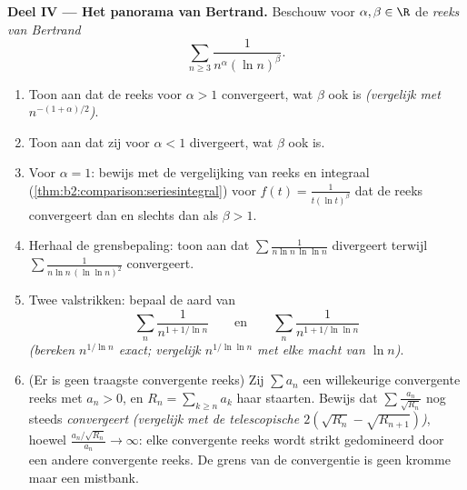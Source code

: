 \begin{problem}[{Weekendopgave --- $\zeta(2) = \pi^2/6$ en het
panorama van Bertrand}]
\medskip
\noindent\textbf{Deel IV --- Het panorama van Bertrand.} Beschouw
voor $\alpha, \beta \in \R$ de \emph{reeks van Bertrand}
\[
\sum_{n \geq 3} \frac{1}{n^{\alpha}(\ln n)^{\beta}} .
\]
\begin{enumerate}[resume]
  \item Toon aan dat de reeks voor $\alpha > 1$ convergeert, wat
        $\beta$ ook is \emph{(vergelijk met
        $n^{-(1+\alpha)/2}$)}.
  \item Toon aan dat zij voor $\alpha < 1$ divergeert, wat $\beta$
        ook is.
  \item Voor $\alpha = 1$: bewijs met de vergelijking van reeks en
        integraal (\cref{thm:b2:comparison:seriesintegral}) voor
        $f(t) = \frac{1}{t(\ln t)^\beta}$ dat de reeks
        convergeert dan en slechts dan als $\beta > 1$.
  \item Herhaal de grensbepaling: toon aan dat
        $\sum\frac{1}{n\ln n\,\ln\ln n}$ divergeert terwijl
        $\sum\frac{1}{n\ln n\,(\ln\ln n)^2}$ convergeert.
  \item Twee valstrikken: bepaal de aard van
        \[
        \sum_n \frac{1}{n^{1 + 1/\ln n}}
        \qquad\text{en}\qquad
        \sum_n \frac{1}{n^{1 + 1/\ln\ln n}}
        \]
        \emph{(bereken $n^{1/\ln n}$ exact; vergelijk
        $n^{1/\ln\ln n}$ met elke macht van $\ln n$)}.
  \item (Er is geen traagste convergente reeks) Zij $\sum a_n$ een
        willekeurige convergente reeks met $a_n > 0$, en $R_n =
        \sum_{k \geq n}a_k$ haar staarten. Bewijs dat $\sum
        \frac{a_n}{\sqrt{R_n}}$ nog steeds \emph{convergeert}
        \emph{(vergelijk met de telescopische
        $2(\sqrt{R_n} - \sqrt{R_{n+1}})$)}, hoewel
        $\frac{a_n/\sqrt{R_n}}{a_n} \to \infty$: elke convergente
        reeks wordt strikt gedomineerd door een andere convergente
        reeks. De grens van de convergentie is geen kromme maar
        een mistbank.
\end{enumerate}


\end{problem}
